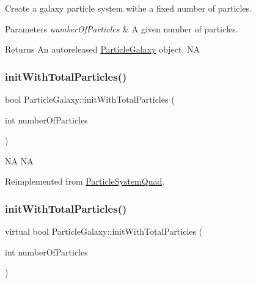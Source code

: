 Create a galaxy particle system withe a fixed number of particles.


\begin{DoxyParams}{Parameters}
{\em number\+Of\+Particles} & A given number of particles. \\
\hline
\end{DoxyParams}
\begin{DoxyReturn}{Returns}
An autoreleased \hyperlink{classParticleGalaxy}{Particle\+Galaxy} object.  NA 
\end{DoxyReturn}
\mbox{\label{classParticleGalaxy_a4c5f713dc7e1c18d85e38cba943ee2dc}} 
\subsubsection{\texorpdfstring{init\+With\+Total\+Particles()}{initWithTotalParticles()}\hspace{0.1cm}{\footnotesize\ttfamily [1/2]}}
{\footnotesize\ttfamily bool Particle\+Galaxy\+::init\+With\+Total\+Particles (\begin{DoxyParamCaption}\item[{int}]{number\+Of\+Particles }\end{DoxyParamCaption})\hspace{0.3cm}{\ttfamily [virtual]}}

NA  NA 

Reimplemented from \hyperlink{classParticleSystemQuad_ae5420007b57e909c05e7476a54fbfbe9}{Particle\+System\+Quad}.

\mbox{\label{classParticleGalaxy_a13c2c56912e3b0d1fda79599bd9eb8bd}} 
\subsubsection{\texorpdfstring{init\+With\+Total\+Particles()}{initWithTotalParticles()}\hspace{0.1cm}{\footnotesize\ttfamily [2/2]}}
{\footnotesize\ttfamily virtual bool Particle\+Galaxy\+::init\+With\+Total\+Particles (\begin{DoxyParamCaption}\item[{int}]{number\+Of\+Particles }\end{DoxyParamCaption})\hspace{0.3cm}{\ttfamily [virtual]}}

